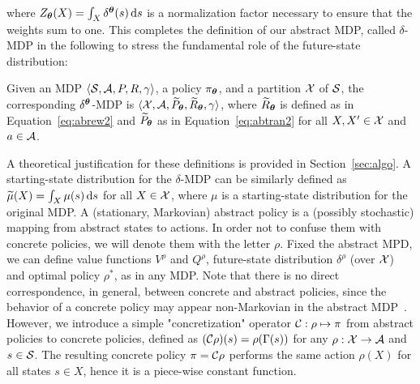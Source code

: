 %
where $Z_{\boldsymbol{\theta}}(X)=\int_{X}\delta^{\boldsymbol{\theta}}(s)\,\mathrm{d} s$ is a normalization factor necessary to ensure that the weights sum to one.
This completes the definition of our abstract MDP, called $\delta$-MDP in the following to stress the fundamental role of the future-state distribution:
%
\begin{definition}\label{def:abmdp}
	Given an MDP $\langle\mathcal{S}, \mathcal{A}, P, R, \gamma\rangle$, a policy $\pi_{\boldsymbol{\theta}}$, and a partition $\mathcal{X}$ of $\mathcal{S}$, the corresponding $\delta^{\boldsymbol{\theta}}$-MDP is $\langle\mathcal{X}, \mathcal{A}, \widetilde{P}_{\boldsymbol{\theta}}, \widetilde{R}_{\boldsymbol{\theta}}, \gamma\rangle$, where $\widetilde{R}_{\boldsymbol{\theta}}$ is defined as in Equation~\eqref{eq:abrew2} and $\widetilde{P}_{\boldsymbol{\theta}}$ as in Equation~\eqref{eq:abtran2} for all $X,X'\in\mathcal{X}$ and $a\in\mathcal{A}$.
\end{definition}
%
A theoretical justification for these definitions is provided in Section~\ref{sec:algo}.
A starting-state distribution for the $\delta$-MDP can be similarly defined as $\widetilde{\mu}(X) = \int_{X}\mu(s)\,\mathrm{d} s$ for all $X\in\mathcal{X}$, where $\mu$ is a starting-state distribution for the original MDP.
%
A (stationary, Markovian) abstract policy is a (possibly stochastic) mapping from abstract states to actions. In order not to confuse them with concrete policies, we will denote them with the letter $\rho$. Fixed the abstract MPD, we can define value functions $V^{\rho}$ and $Q^{\rho}$, future-state distribution $\delta^{\rho}$ (over $\mathcal{X}$) and optimal policy $\rho^{*}$, as in any MDP. Note that there is no direct correspondence, in general, between concrete and abstract policies, since the behavior of a concrete policy may appear non-Markovian in the abstract MDP~\citep{lihong2006towards}.
However, we introduce a simple "concretization" operator $\mathcal{C}: \rho \mapsto \pi$ from abstract policies to concrete policies, defined as
$(\mathcal{C}\rho)(s) = \rho(\Gamma(s))$
for any $\rho:\mathcal{X}\to\mathcal{A}$ and $s\in\mathcal{S}$. The resulting concrete policy $\pi = \mathcal{C}\rho$ performs the same action $\rho(X)$ for all states $s\in X$, hence it is a piece-wise constant function.

